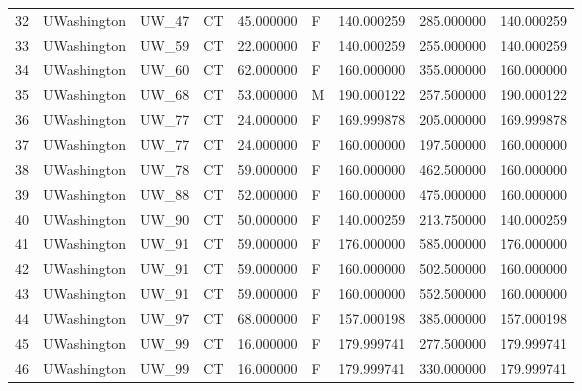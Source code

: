 \begin{tabular}{llllrlrrr}
32     &     UWashington &        UW\_47 &                 CT &  45.000000 &        F &       140.000259 &    285.000000 &  140.000259 \\
33     &     UWashington &        UW\_59 &                 CT &  22.000000 &        F &       140.000259 &    255.000000 &  140.000259 \\
34     &     UWashington &        UW\_60 &                 CT &  62.000000 &        F &       160.000000 &    355.000000 &  160.000000 \\
35     &     UWashington &        UW\_68 &                 CT &  53.000000 &        M &       190.000122 &    257.500000 &  190.000122 \\
36     &     UWashington &        UW\_77 &                 CT &  24.000000 &        F &       169.999878 &    205.000000 &  169.999878 \\
37     &     UWashington &        UW\_77 &                 CT &  24.000000 &        F &       160.000000 &    197.500000 &  160.000000 \\
38     &     UWashington &        UW\_78 &                 CT &  59.000000 &        F &       160.000000 &    462.500000 &  160.000000 \\
39     &     UWashington &        UW\_88 &                 CT &  52.000000 &        F &       160.000000 &    475.000000 &  160.000000 \\
40     &     UWashington &        UW\_90 &                 CT &  50.000000 &        F &       140.000259 &    213.750000 &  140.000259 \\
41     &     UWashington &        UW\_91 &                 CT &  59.000000 &        F &       176.000000 &    585.000000 &  176.000000 \\
42     &     UWashington &        UW\_91 &                 CT &  59.000000 &        F &       160.000000 &    502.500000 &  160.000000 \\
43     &     UWashington &        UW\_91 &                 CT &  59.000000 &        F &       160.000000 &    552.500000 &  160.000000 \\
44     &     UWashington &        UW\_97 &                 CT &  68.000000 &        F &       157.000198 &    385.000000 &  157.000198 \\
45     &     UWashington &        UW\_99 &                 CT &  16.000000 &        F &       179.999741 &    277.500000 &  179.999741 \\
46     &     UWashington &        UW\_99 &                 CT &  16.000000 &        F &       179.999741 &    330.000000 &  179.999741 \\

\end{tabular}
